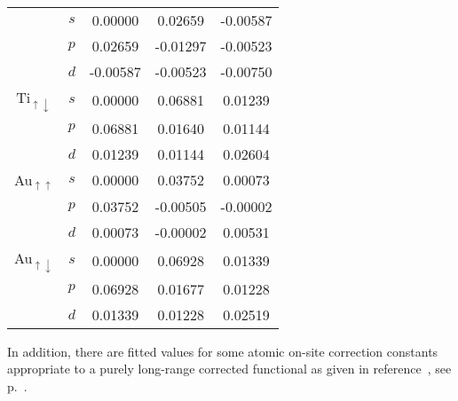 \begin{center}
\begin{small}
\begin{tabular}{|cc|ccc|}
&$s$ & 0.00000& 0.02659&-0.00587\\
&$p$ & 0.02659&-0.01297&-0.00523\\
&$d$ &-0.00587&-0.00523&-0.00750\\\cline{3-5}
Ti$_{\uparrow\downarrow}$
&$s$ &0.00000& 0.06881& 0.01239\\
&$p$ &0.06881& 0.01640& 0.01144\\
&$d$ &0.01239& 0.01144& 0.02604\\\hline
Au$_{\uparrow\uparrow}$
&$s$ &0.00000& 0.03752& 0.00073\\
&$p$ &0.03752&-0.00505&-0.00002\\
&$d$ &0.00073&-0.00002& 0.00531\\\cline{3-5}
Au$_{\uparrow\downarrow}$
&$s$ &0.00000& 0.06928& 0.01339\\
&$p$ &0.06928& 0.01677& 0.01228\\
&$d$ &0.01339& 0.01228& 0.02519\\\hline
\end{tabular}
\end{small}
\end{center}

In addition, there are fitted values for some atomic on-site correction constants
appropriate to a purely long-range corrected functional as given in reference~\cite{Lee_JCTC_2022},
see p.~.

